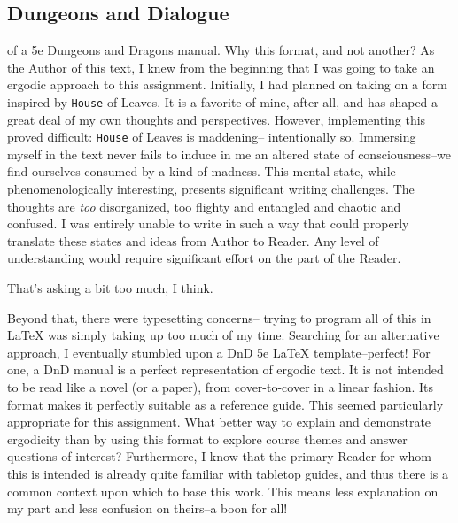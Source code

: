 \documentclass[10pt,twoside,twocolumn,openany,nomultitoc]{book}
\begin{document}
\subsection{Dungeons and Dialogue}
 of a 5e Dungeons and Dragons manual. Why this format, and not another? As the Author of this text, I knew from the beginning that I was going to take an ergodic approach to this assignment. Initially, I had planned on taking on a form inspired by \texttt{\color{blue}House} \color{black} of Leaves. It is a favorite of mine, after all, and has shaped a great deal of my own thoughts and perspectives. However, implementing this proved difficult:  \texttt{\color{blue}House} \color{black}of Leaves is maddening-- intentionally so.  Immersing myself in the text never fails to induce in me an altered state of consciousness--we find ourselves consumed by a kind of madness. This mental state, while phenomenologically interesting, presents significant writing challenges. The thoughts are \textit{too} disorganized, too flighty and entangled and chaotic and confused. I was entirely unable to write in such a way that could properly translate these states and ideas from Author to Reader. Any level of understanding would require significant effort on the part of the Reader. \\\vspace{2pt}

That's asking a bit too much, I think. \\\vspace{2pt}

Beyond that, there were typesetting concerns-- trying to program all of this in \LaTeX\hspace{1pt}  was simply taking up too much of my time. Searching for an alternative approach, I eventually stumbled upon a DnD 5e  \LaTeX\hspace{1pt}  template--perfect! For one, a DnD manual is a perfect representation of ergodic text. It is not intended to be read like a novel (or a paper), from cover-to-cover in a linear fashion. Its format makes it perfectly suitable as a reference guide. This seemed particularly appropriate for this assignment.  What better way to explain and demonstrate ergodicity than by using this format to explore course themes and answer questions of interest?  Furthermore, I know that the primary Reader for whom this is intended is already quite familiar with tabletop guides, and thus there is a common context upon which to base this work. This means less explanation on my part and less confusion on theirs--a boon for all!\\
     
\end{document}
